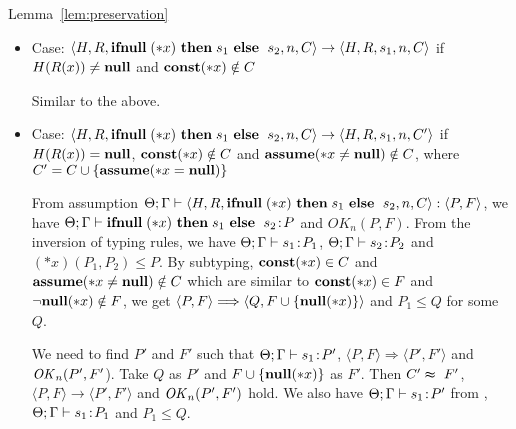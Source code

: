 \begin{pfof}{Lemma~\ref{lem:preservation}}
\begin{itemize}
\item Case: \(\langle H, R, \IFNULL \Sirx \ \THEN s_{1} \ \ELSE
  \ s_{2}, n, C\rangle \rightarrow \langle H, R, s_{1}, n, C \rangle\)
  if \(H(R(x)) \neq \mathbf{null}\) and \(\mathbf{const}(*x) \notin C\)

    Similar to the above.
  
\item Case: \(\langle H, R, \IFNULL \Sirx \ \THEN s_{1} \ \ELSE
  \ s_{2}, n, C\rangle \rightarrow \langle H, R, s_{1}, n, C'
  \rangle\) if \(H(R(x)) = \mathbf{null}\), \(\mathbf{const}(*x) \notin C\) and
  \(\mathbf{assume}(*x \ne \mathbf{null}) \notin C\), where \(C' = C \cup \{\mathbf{assume}(*x = \mathbf{null})\}\)

  From assumption \( \Theta; \Gamma \vdash \langle H, R, \mathbf{ifnull}\;(*x)
  \ \mathbf{then}\; s_{1} \ \mathbf{else}\; \ s_{2}, n, C \rangle : \langle P, F
  \rangle\), we have \(\Theta; \Gamma \vdash \mathbf{ifnull}\;(*x) \ \mathbf{then}\;
  s_{1} \ \mathbf{else}\; \ s_{2} \!:\! P \) and \(OK_n(P, F)\). From the
  inversion of typing rules, we have \(\Theta; \Gamma \vdash s_{1}
  \!:\! P_1\), \(\Theta; \Gamma \vdash s_{2} \!:\! P_2\) and \((*x)(P_1,
  P_2) \le P\). By subtyping, \(\mathbf{const}(*x) \in C\) and \(\mathbf{assume}(*x \ne \mathbf{null})
  \notin C\) which are similar to \(\mathbf{const}(*x) \in F\) and \(\neg{\bf null}(*x)
  \notin F\), we get \(\langle P, F \rangle \Longrightarrow \langle Q,
  F\cup \{{\bf null}(*x)\} \rangle \) and \(P_1 \le Q\) for some \(Q\).
  
  We need to find \(P'\) and \(F'\) such that \(\Theta;\Gamma \vdash
  s_1 \!:\! P'\), \( \langle P, F \rangle \Longrightarrow \langle P',
  F' \rangle\) and \(\mathit{OK}_n(P', F'\)). Take \(Q\) as \(P'\) and \(F\cup
  \{{\bf null}(*x)\}\) as \(F'\). Then \(C' \thickapprox\ F'\), \( \langle P,F
  \rangle \rightarrow \langle P', F' \rangle\) and \(\mathit{OK}_n(P', F')\)
  hold.  We also have \(\Theta; \Gamma \vdash s_1 \!:\! P'\) from
  , \(\Theta; \Gamma \vdash s_1 \!:\! P_1\) and \( P_1 \le
  Q\).





\end{itemize}
\end{pfof}
